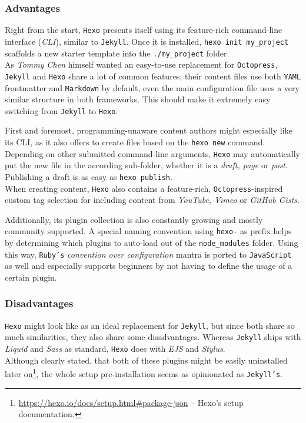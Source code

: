 \subsubsection{Advantages}
Right from the start, \texttt{Hexo} presents itself using its feature-rich command-line interface (\emph{CLI}), similar to \texttt{Jekyll}. Once it is installed, \texttt{hexo init my\_project} scaffolds a new starter template into the \texttt{./my\_project} folder.\\
As \emph{Tommy Chen} himself wanted an easy-to-use replacement for \texttt{Octopress}, \texttt{Jekyll} and \texttt{Hexo} share a lot of common features; their content files use both \texttt{YAML} frontmatter and \texttt{Markdown} by default, even the main configuration file uses a very similar structure in both frameworks. This should make it extremely easy switching from \texttt{Jekyll} to \texttt{Hexo}.

First and foremost, programming-unaware content authors might especially like its CLI, as it also offers to create files based on the \texttt{hexo new} command. Depending on other submitted command-line arguments, \texttt{Hexo} may automatically put the new file in the according sub-folder, whether it is a \emph{draft, page} or \emph{post}. Publishing a draft is as easy as \texttt{hexo publish}.\\
When creating content, \texttt{Hexo} also contains a feature-rich, \texttt{Octopress}-inspired custom tag selection for including content from \emph{YouTube, Vimeo} or \emph{GitHub Gists}.

Additionally, its plugin collection is also constantly growing and mostly community supported. A special naming convention using \texttt{hexo-} as prefix helps by determining which plugins to auto-load out of the \texttt{node\_modules} folder. Using this way, \texttt{Ruby's} \emph{convention over configuration} mantra is ported to \texttt{JavaScript} as well and especially supports beginners by not having to define the usage of a certain plugin.

\subsubsection{Disadvantages}
\texttt{Hexo} might look like as an ideal replacement for \texttt{Jekyll}, but since both share so much similarities, they also share some disadvantages. Whereas \texttt{Jekyll} ships with \emph{Liquid} and \emph{Sass} as standard, \texttt{Hexo} does with \emph{EJS} and \emph{Stylus}.\\
Although clearly stated, that both of these plugins might be easily uninstalled later on\footnote{\url{https://hexo.io/docs/setup.html\#package-json} -- Hexo's setup documentation.}, the whole setup pre-installation seems as opinionated as \texttt{Jekyll's}.

